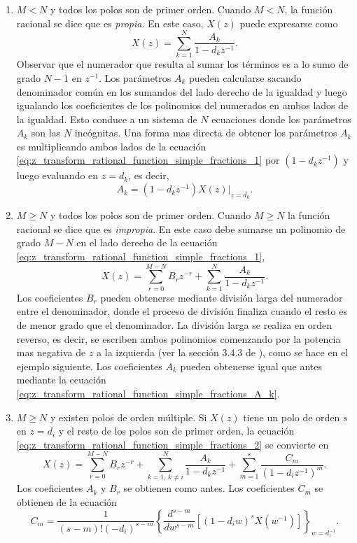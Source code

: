 \documentclass[a4paper]{report}
\begin{document}
\begin{enumerate}
 \item \(M<N\) y todos los polos son de primer orden. Cuando \(M<N\), la función racional se dice que es \emph{propia}. En este caso, \(X(z)\) puede expresarse como
 \begin{equation}\label{eq:z_transform_rational_function_simple_fractions_1}
  X(z)=\sum_{k=1}^N\frac{A_k}{1-d_kz^{-1}}.  
 \end{equation}
 Observar que el numerador que resulta al sumar los términos es a lo sumo de grado \(N-1\) en \(z^{-1}\).
 Los parámetros \(A_k\) pueden calcularse sacando denominador común en los sumandos del lado derecho de la igualdad y luego igualando los coeficientes de los polinomios del numerados en ambos lados de la igualdad. Esto conduce a un sistema de \(N\) ecuaciones donde los parámetros \(A_k\) son las \(N\) incógnitas. Una forma mas directa de obtener los parámetros \(A_k\) es multiplicando ambos lados de la ecuación \ref{eq:z_transform_rational_function_simple_fractions_1} por \((1-d_kz^{-1})\) y luego evaluando en \(z=d_k\), es decir,
 \begin{equation}\label{eq:z_transform_rational_function_simple_fractions_A_k}
  A_k=(1-d_kz^{-1})X(z)\big|_{z=d_k}.  
 \end{equation}
 \item \(M\geq N\) y todos los polos son de primer orden. Cuando \(M\geq N\) la función racional se dice que es \emph{impropia}. En este caso debe sumarse un polinomio de grado \(M-N\) en el lado derecho de la ecuación \ref{eq:z_transform_rational_function_simple_fractions_1},
 \begin{equation}\label{eq:z_transform_rational_function_simple_fractions_2}
  X(z)=\sum_{r=0}^{M-N}B_rz^{-r}+\sum_{k=1}^N\frac{A_k}{1-d_kz^{-1}}.  
 \end{equation}
 Los coeficientes \(B_r\) pueden obtenerse mediante división larga del numerador entre el denominador, donde el proceso de división finaliza cuando el resto es de menor grado que el denominador. La división larga se realiza en orden reverso, es decir, se escriben ambos polinomios comenzando por la potencia mas negativa de \(z\) a la izquierda (ver la sección 3.4.3 de \cite{proakis06digital}), como se hace en el ejemplo siguiente.
 Los coeficientes \(A_k\) pueden obtenerse igual que antes mediante la ecuación \ref{eq:z_transform_rational_function_simple_fractions_A_k}.
 \item \(M\geq N\) y existen polos de orden múltiple. Si \(X(z)\) tiene un polo de orden \(s\) en \(z=d_i\) y el resto de los polos son de primer orden, la ecuación \ref{eq:z_transform_rational_function_simple_fractions_2} se convierte en
 \begin{equation}\label{eq:z_transform_rational_function_simple_fractions_3}
  X(z)=\sum_{r=0}^{M-N}B_rz^{-r}+\sum_{k=1,\,k\neq i}^N\frac{A_k}{1-d_kz^{-1}}+\sum_{m=1}^s\frac{C_m}{(1-d_iz^{-1})^m}.  
 \end{equation}
 Los coeficientes \(A_k\) y \(B_r\) se obtienen como antes. Los coeficientes \(C_m\) se obtienen de la ecuación
 \[
  C_m=\frac{1}{(s-m)!(-d_i)^{s-m}}\left\{\frac{d^{s-m}}{dw^{s-m}}\left[(1-d_iw)^sX(w^{-1})\right]\right\}_{w=d_i^{-1}}.
 \]
\end{enumerate}
\end{document}
